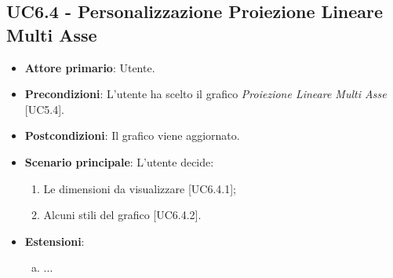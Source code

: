 \subsection{UC6.4 - Personalizzazione Proiezione Lineare Multi Asse}
\begin{itemize}
	\item \textbf{Attore primario}: Utente.
	
	\item \textbf{Precondizioni}: L'utente ha scelto il grafico \textit{Proiezione Lineare Multi Asse} [UC5.4].
	
	\item \textbf{Postcondizioni}: Il grafico viene aggiornato.
	
	\item \textbf{Scenario principale}: L'utente decide:
	
\begin{enumerate}
\item Le dimensioni da visualizzare [UC6.4.1];
\item Alcuni stili del grafico [UC6.4.2].
\end{enumerate}	
		
	\item \textbf{Estensioni}:
	\begin{enumerate}[(a)]
		\item ...
	\end{enumerate}
\end{itemize}
